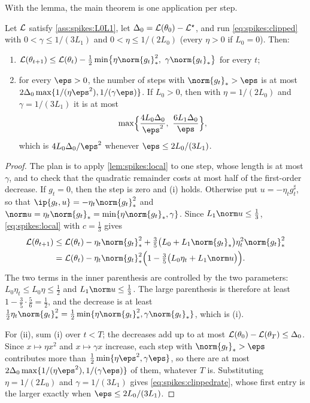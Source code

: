 \begin{refsection}
With the lemma, the main theorem is one application per step.

\begin{theorem}\label{thm:spikes:clipped}
Let $\mathcal{L}$ satisfy \cref{ass:spikes:L0L1}, let $\Delta_0=\mathcal{L}(\theta_0)-\mathcal{L}^\star$, and run \eqref{eq:spikes:clipped} with $0<\gamma\le1/(3L_1)$ and $0<\eta\le1/(2L_0)$ (every $\eta>0$ if $L_0=0$). Then:
\begin{enumerate}
\item $\Loss(\theta_{t+1})\le\Loss(\theta_t)-\frac12\min\bigl\{\eta\norm{g_t}_*^2,\ \gamma\norm{g_t}_*\bigr\}$ for every $t$;
\item for every $\eps>0$, the number of steps with $\norm{g_t}_*>\eps$ is at most $2\Delta_0\max\{1/(\eta\eps^2),1/(\gamma\eps)\}$. If $L_0>0$, then with $\eta=1/(2L_0)$ and $\gamma=1/(3L_1)$ it is at most
\begin{equation}\label{eq:spikes:clippedrate}
  \max\Bigl\{\frac{4L_0\Delta_0}{\eps^2},\ \frac{6L_1\Delta_0}{\eps}\Bigr\},
\end{equation}
which is $4L_0\Delta_0/\eps^2$ whenever $\eps\le2L_0/(3L_1)$.
\end{enumerate}
\end{theorem}

\begin{proof}
The plan is to apply \cref{lem:spikes:local} to one step, whose length is at most $\gamma$, and to check that the quadratic remainder costs at most half of the first-order decrease. If $g_t=0$, then the step is zero and (i) holds. Otherwise put $u=-\eta_tg_t^\sharp$, so that $\ip{g_t,u}=-\eta_t\norm{g_t}_*^2$ and $\norm u=\eta_t\norm{g_t}_*=\min\{\eta\norm{g_t}_*,\gamma\}$. Since $L_1\norm u\le\frac13$, \eqref{eq:spikes:local} with $c=\frac13$ gives
\begin{align*}
  \Loss(\theta_{t+1})&\le\Loss(\theta_t)-\eta_t\norm{g_t}_*^2+\tfrac35\bigl(L_0+L_1\norm{g_t}_*\bigr)\eta_t^2\norm{g_t}_*^2\\
  &=\Loss(\theta_t)-\eta_t\norm{g_t}_*^2\Bigl(1-\tfrac35\bigl(L_0\eta_t+L_1\norm u\bigr)\Bigr).
\end{align*}
The two terms in the inner parenthesis are controlled by the two parameters: $L_0\eta_t\le L_0\eta\le\frac12$ and $L_1\norm u\le\frac13$. The large parenthesis is therefore at least $1-\frac35\cdot\frac56=\frac12$, and the decrease is at least $\frac12\eta_t\norm{g_t}_*^2=\frac12\min\{\eta\norm{g_t}_*^2,\gamma\norm{g_t}_*\}$, which is (i).

For (ii), sum (i) over $t<T$; the decreases add up to at most $\mathcal{L}(\theta_0)-\mathcal{L}(\theta_T)\le\Delta_0$. Since $x\mapsto\eta x^2$ and $x\mapsto\gamma x$ increase, each step with $\norm{g_t}_*>\eps$ contributes more than $\frac12\min\{\eta\eps^2,\gamma\eps\}$, so there are at most $2\Delta_0\max\{1/(\eta\eps^2),1/(\gamma\eps)\}$ of them, whatever $T$ is. Substituting $\eta=1/(2L_0)$ and $\gamma=1/(3L_1)$ gives \eqref{eq:spikes:clippedrate}, whose first entry is the larger exactly when $\eps\le2L_0/(3L_1)$.
\end{proof}


\end{refsection}
